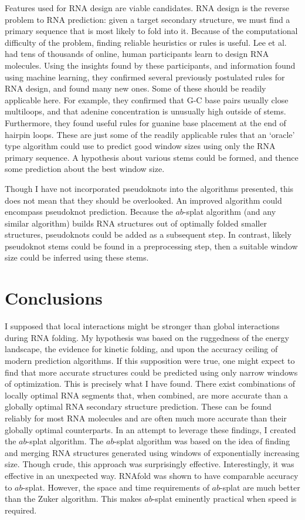 \documentclass{cshonours}
\begin{document}
Features used for RNA design are viable candidates. RNA design is the reverse problem to RNA prediction: given a target secondary structure, we must find a primary sequence that is most likely to fold into it. Because of the computational difficulty of the problem, finding reliable heuristics or rules is useful. Lee et al. \cite{lee2014rna} had tens of thousands of online, human participants learn to design RNA molecules. Using the insights found by these participants, and information found using machine learning, they confirmed several previously postulated rules for RNA design, and found many new ones. Some of these should be readily applicable here. For example, they confirmed that G-C base pairs usually close multiloops, and that adenine concentration is unusually high outside of stems. Furthermore, they found useful rules for guanine base placement at the end of hairpin loops. These are just some of the readily applicable rules that an `oracle' type algorithm could use to predict good window sizes using only the RNA primary sequence. A hypothesis about various stems could be formed, and thence some prediction about the best window size.

Though I have not incorporated pseudoknots into the algorithms presented, this does not mean that they should be overlooked. An improved algorithm could encompass pseudoknot prediction. Because the $ab$-splat algorithm (and any similar algorithm) builds RNA structures out of optimally folded smaller structures, pseudoknots could be added as a subsequent step. In contrast, likely pseudoknot stems could be found in a preprocessing step, then a suitable window size could be inferred using these stems.


\section{Conclusions}
I supposed that local interactions might be stronger than global interactions during RNA folding. My hypothesis was based on the ruggedness of the energy landscape, the evidence for kinetic folding, and upon the accuracy ceiling of modern prediction algorithms. If this supposition were true, one might expect to find that more accurate structures could be predicted using only narrow windows of optimization. This is precisely what I have found. There exist combinations of locally optimal RNA segments that, when combined, are more accurate than a globally optimal RNA secondary structure prediction. These can be found reliably for most RNA molecules and are often much more accurate than their globally optimal counterparts. In an attempt to leverage these findings, I created the $ab$-splat algorithm. The $ab$-splat algorithm was based on the idea of finding and merging RNA structures generated using windows of exponentially increasing size. Though crude, this approach was surprisingly effective. Interestingly, it was effective in an unexpected way. RNAfold was shown to have comparable accuracy to $ab$-splat. However, the space and time requirements of $ab$-splat are much better than the Zuker algorithm. This makes $ab$-splat eminently practical when speed is required.
\end{document}
